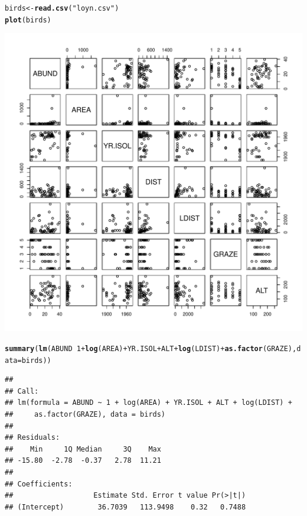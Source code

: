 \documentclass[12pt,a4paper]{scrartcl}\usepackage[]{graphicx}\usepackage[]{color}
\makeatletter
\def\maxwidth{ %
  \ifdim\Gin@nat@width>\linewidth
    \linewidth
  \else
    \Gin@nat@width
  \fi
}
\newcommand{\hlnum}[1]{\textcolor[rgb]{0.686,0.059,0.569}{#1}}%
\newcommand{\hlstr}[1]{\textcolor[rgb]{0.192,0.494,0.8}{#1}}%
\newcommand{\hlopt}[1]{\textcolor[rgb]{0,0,0}{#1}}%
\newcommand{\hlstd}[1]{\textcolor[rgb]{0.345,0.345,0.345}{#1}}%
\newcommand{\hlkwb}[1]{\textcolor[rgb]{0.69,0.353,0.396}{#1}}%
\newcommand{\hlkwc}[1]{\textcolor[rgb]{0.333,0.667,0.333}{#1}}%
\newcommand{\hlkwd}[1]{\textcolor[rgb]{0.737,0.353,0.396}{\textbf{#1}}}%
\newenvironment{kframe}{%
 \def\at@end@of@kframe{}%
 \ifinner\ifhmode%
  \def\at@end@of@kframe{\end{minipage}}%
  \begin{minipage}{\columnwidth}%
 \fi\fi%
 \def\FrameCommand##1{\hskip\@totalleftmargin \hskip-\fboxsep
 \colorbox{shadecolor}{##1}\hskip-\fboxsep
     \hskip-\linewidth \hskip-\@totalleftmargin \hskip\columnwidth}%
 \MakeFramed {\advance\hsize-\width
   \@totalleftmargin\z@ \linewidth\hsize
   \@setminipage}}%
 {\par\unskip\endMakeFramed%
 \at@end@of@kframe}
\newenvironment{knitrout}{}{} %
\makeatother
\begin{document}
\begin{Answer}  
\begin{knitrout}
\color{fgcolor}\begin{kframe}
\begin{alltt}
\hlstd{birds} \hlkwb{<-} \hlkwd{read.csv}\hlstd{(}\hlstr{"loyn.csv"}\hlstd{)}
\hlkwd{plot}\hlstd{(birds)}
\end{alltt}
\end{kframe}
\includegraphics[width=\maxwidth]{figure/unnamed-chunk-9-1} 
\begin{kframe}\begin{alltt}
\hlkwd{summary}\hlstd{(}\hlkwd{lm}\hlstd{(ABUND} \hlopt{~} \hlnum{1} \hlopt{+} \hlkwd{log}\hlstd{(AREA)} \hlopt{+} \hlstd{YR.ISOL} \hlopt{+} \hlstd{ALT} \hlopt{+} \hlkwd{log}\hlstd{(LDIST)} \hlopt{+} \hlkwd{as.factor}\hlstd{(GRAZE),} \hlkwc{data} \hlstd{= birds))}
\end{alltt}
\begin{verbatim}
## 
## Call:
## lm(formula = ABUND ~ 1 + log(AREA) + YR.ISOL + ALT + log(LDIST) + 
##     as.factor(GRAZE), data = birds)
## 
## Residuals:
##    Min     1Q Median     3Q    Max 
## -15.80  -2.78  -0.37   2.78  11.21 
## 
## Coefficients:
##                   Estimate Std. Error t value Pr(>|t|)    
## (Intercept)        36.7039   113.9498    0.32   0.7488    

\end{verbatim}
\end{kframe}
\end{knitrout}
\end{Answer}
\end{document}
